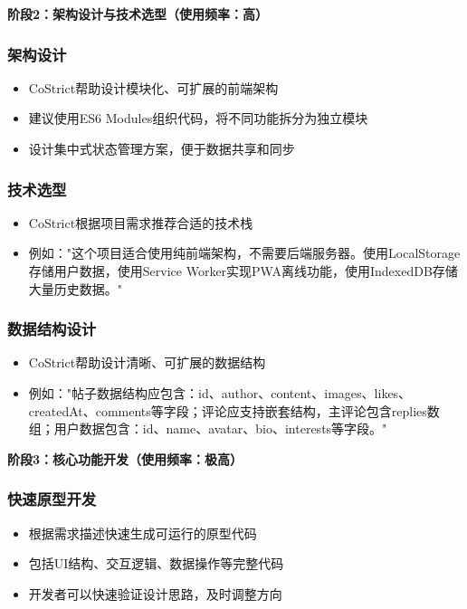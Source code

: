 \documentclass[12pt,a4paper]{article}
\begin{document}
\textbf{阶段2：架构设计与技术选型（使用频率：高）}

\subsubsection{架构设计}
\begin{itemize}
    \item CoStrict帮助设计模块化、可扩展的前端架构
    \item 建议使用ES6 Modules组织代码，将不同功能拆分为独立模块
    \item 设计集中式状态管理方案，便于数据共享和同步
\end{itemize}

\subsubsection{技术选型}
\begin{itemize}
    \item CoStrict根据项目需求推荐合适的技术栈
    \item 例如："这个项目适合使用纯前端架构，不需要后端服务器。使用LocalStorage存储用户数据，使用Service Worker实现PWA离线功能，使用IndexedDB存储大量历史数据。"
\end{itemize}

\subsubsection{数据结构设计}
\begin{itemize}
    \item CoStrict帮助设计清晰、可扩展的数据结构
    \item 例如："帖子数据结构应包含：id、author、content、images、likes、createdAt、comments等字段；评论应支持嵌套结构，主评论包含replies数组；用户数据包含：id、name、avatar、bio、interests等字段。"
\end{itemize}

\textbf{阶段3：核心功能开发（使用频率：极高）}

\subsubsection{快速原型开发}
\begin{itemize}
    \item 根据需求描述快速生成可运行的原型代码
    \item 包括UI结构、交互逻辑、数据操作等完整代码
    \item 开发者可以快速验证设计思路，及时调整方向
\end{itemize}
\end{document}
